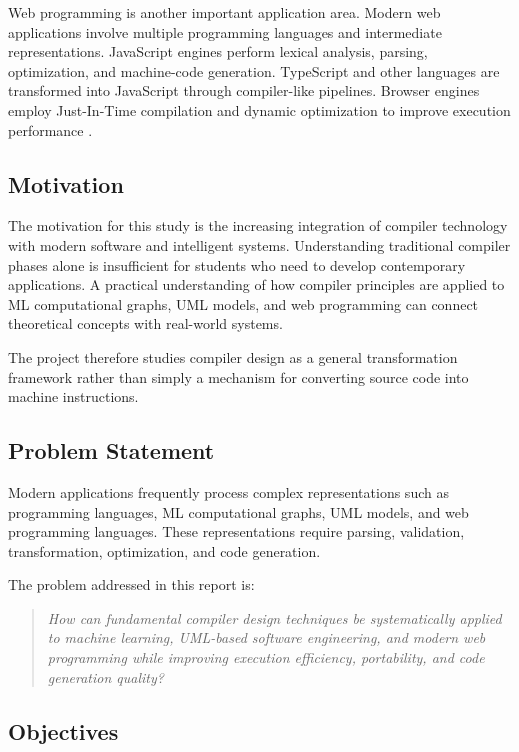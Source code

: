 \documentclass[12pt,a4paper]{article}
\begin{document}
Web programming is another important application area. Modern web applications
involve multiple programming languages and intermediate representations.
JavaScript engines perform lexical analysis, parsing, optimization, and
machine-code generation. TypeScript and other languages are transformed into
JavaScript through compiler-like pipelines. Browser engines employ
Just-In-Time compilation and dynamic optimization to improve execution
performance \cite{ecma2024,v8team2024}.

\subsection{Motivation}

The motivation for this study is the increasing integration of compiler
technology with modern software and intelligent systems. Understanding
traditional compiler phases alone is insufficient for students who need to
develop contemporary applications. A practical understanding of how compiler
principles are applied to ML computational graphs, UML models, and web
programming can connect theoretical concepts with real-world systems.

The project therefore studies compiler design as a general transformation
framework rather than simply a mechanism for converting source code into
machine instructions.

\subsection{Problem Statement}

Modern applications frequently process complex representations such as
programming languages, ML computational graphs, UML models, and web
programming languages. These representations require parsing, validation,
transformation, optimization, and code generation.

The problem addressed in this report is:

\begin{quote}
\textit{How can fundamental compiler design techniques be systematically
applied to machine learning, UML-based software engineering, and modern web
programming while improving execution efficiency, portability, and code
generation quality?}
\end{quote}

\subsection{Objectives}
\end{document}
